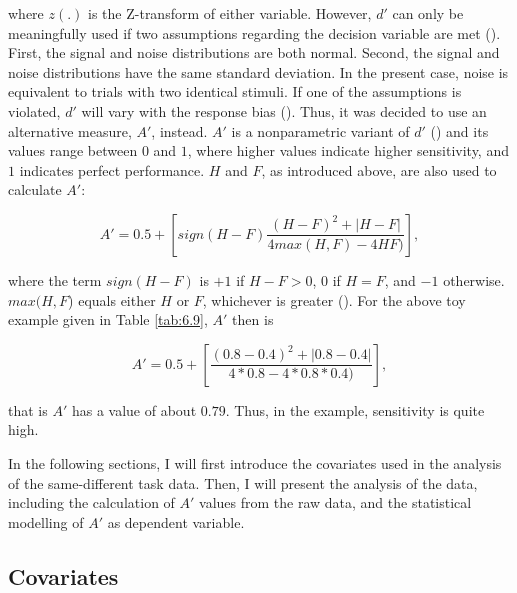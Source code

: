 where $z(.)$ is the Z-transform of either variable. However, $d'$ can only be meaningfully used if two assumptions regarding the decision variable are met (\cite{Stanislaw1999}). First, the signal and noise distributions are both normal. Second, the signal and noise distributions have the same standard deviation. In the present case, noise is equivalent to trials with two identical stimuli. If one of the assumptions is violated, $d'$ will vary with the response bias (\cite{Stanislaw1999}). Thus, it was decided to use an alternative measure, $A'$, instead. $A'$ is a nonparametric variant of $d'$ (\cite{Pollack1964}) and its values range between $0$ and $1$, where higher values indicate higher sensitivity, and $1$ indicates perfect performance. $H$ and $F$, as introduced above, are also used to calculate $A'$:

\begin{equation}
\label{eq:aprime}
    A'=0.5+\left [ sign(H-F)\frac{(H-F)^2+|H-F|}{4max(H,F)-4HF)}\right ],
\end{equation}

where the term $sign(H-F)$ is $+1$ if $H-F>0$, $0$ if $H=F$, and $-1$ otherwise. $max⁡(H,F$) equals either $H$ or $F$, whichever is greater (\cite{Stanislaw1999}). For the above toy example given in Table \ref{tab:6.9}, $A'$ then is

\begin{equation}
\label{eq:aprimeex}
    A'=0.5+\left [ \frac{(0.8-0.4)^2+|0.8-0.4|}{4*0.8-4*0.8*0.4)}\right ],
\end{equation}

that is $A'$ has a value of about $0.79$. Thus, in the example, sensitivity is quite high.

In the following sections, I will first introduce the covariates used in the analysis of the same-different task data. Then, I will present the analysis of the data, including the calculation of $A'$ values from the raw data, and the statistical modelling of $A'$ as dependent variable.

\subsection{Covariates}\label{section06_2_1}

